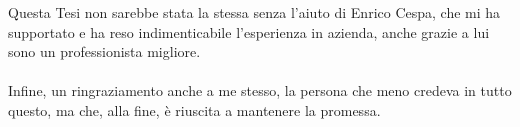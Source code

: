 Questa Tesi non sarebbe stata la stessa senza l’aiuto di Enrico Cespa, che mi ha supportato e ha reso indimenticabile l’esperienza in azienda, anche grazie a 
lui sono un professionista migliore. \\ \\

Infine, un ringraziamento anche a me stesso, la persona che meno credeva in tutto questo, ma che, alla fine, è riuscita a mantenere la promessa. \\ \\

